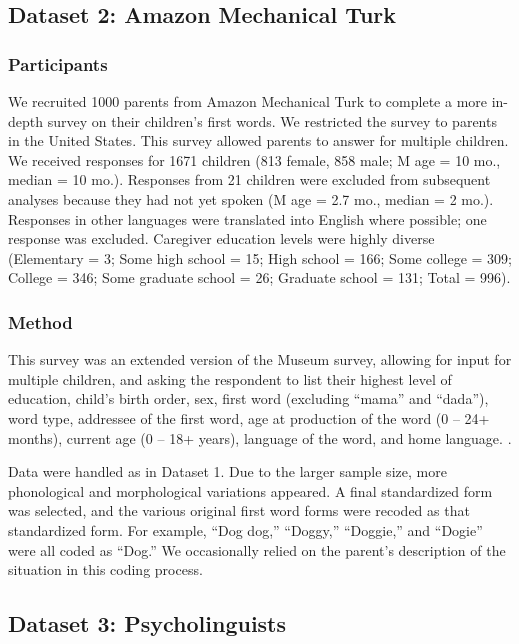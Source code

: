\documentclass[10pt,letterpaper]{article}
\begin{document}
\subsection{Dataset 2: Amazon Mechanical Turk}

\subsubsection{Participants}

We recruited 1000 parents from Amazon Mechanical Turk to complete a more in-depth survey on their children's first words. We restricted the survey to parents in the United States. This survey allowed parents to answer for multiple children. We received responses for 1671 children (813 female, 858 male; M age = 10 mo., median = 10 mo.). Responses from 21 children were excluded from subsequent analyses because they had not yet spoken (M age = 2.7 mo., median = 2 mo.). Responses in other languages were translated into English where possible; one response was excluded. Caregiver education levels were highly diverse (Elementary = 3; Some high school = 15; High school = 166; Some college = 309; College = 346; Some graduate school = 26; Graduate school = 131; Total = 996).

\subsubsection{Method}

This survey was an extended version of the Museum survey, allowing for input for multiple children, and asking the respondent to list their highest level of education, child's birth order, sex, first word (excluding ``mama'' and ``dada''), word type, addressee of the first word, age at production of the word (0 -- 24+ months), current age (0 -- 18+ years), language of the word, and home language. . 

Data were handled as in Dataset 1. Due to the larger sample size, more phonological and morphological variations appeared. A final standardized form was selected, and the various original first word forms were recoded as that standardized form. For example, ``Dog dog,'' ``Doggy,'' ``Doggie,'' and ``Dogie'' were all coded as ``Dog.'' We occasionally relied on the parent's description of the situation in this coding process.

\subsection{Dataset 3: Psycholinguists }
\end{document}
